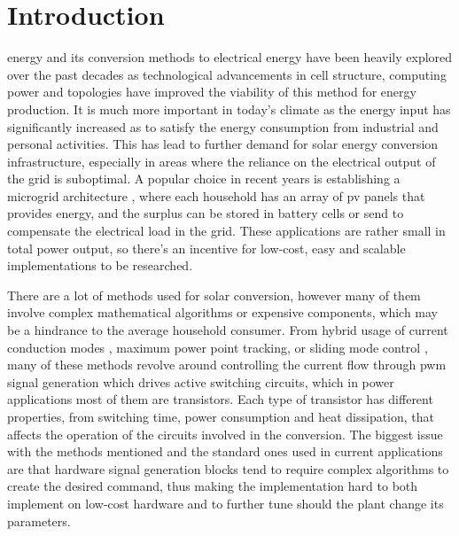 \chapter{Introduction}
\label{chap:introduction}

 energy and its conversion methods to electrical energy have been heavily explored \cite{pena2014robust, de2023sliding, 10.3389/fenrg.2024.1498514, systematiclcl2015}over the past decades as technological advancements in cell structure, computing power and topologies have improved the viability of this method for energy production.
It is much more important in today's climate as the energy input has significantly increased as to satisfy the energy consumption from industrial and personal activities.
This has lead to further demand for solar energy conversion infrastructure, especially in areas where the reliance on the electrical output of the grid is suboptimal.
A popular choice in recent years is establishing a microgrid architecture \cite{pena2014robust}, where each household has an array of \gls{pv} panels that provides energy, and the surplus can be stored in battery cells or send to compensate the electrical load in the grid.
These applications are rather small in total power output, so there's an incentive for low-cost, easy and scalable implementations to be researched.

There are a lot of methods used for solar conversion, however many of them involve complex mathematical algorithms or expensive components, which may be a hindrance to the average household consumer\cite{rashid2013power}. 
From hybrid usage of current conduction modes \cite{morroni2009adaptive}, maximum power point tracking, or sliding mode control \cite{de2023sliding}, many of these methods revolve around controlling the current flow through \gls{pwm} signal generation which drives active switching circuits, which in power applications most of them are transistors.
Each type of transistor has different properties, from switching time, power consumption and heat dissipation, that affects the operation of the circuits involved in the conversion.
The biggest issue with the methods mentioned and the standard ones used in current applications are that hardware signal generation blocks tend to require complex algorithms \cite{reznik2013lcl} to create the desired command, thus making the implementation hard to both implement on low-cost hardware and to further tune should the plant change its parameters.

